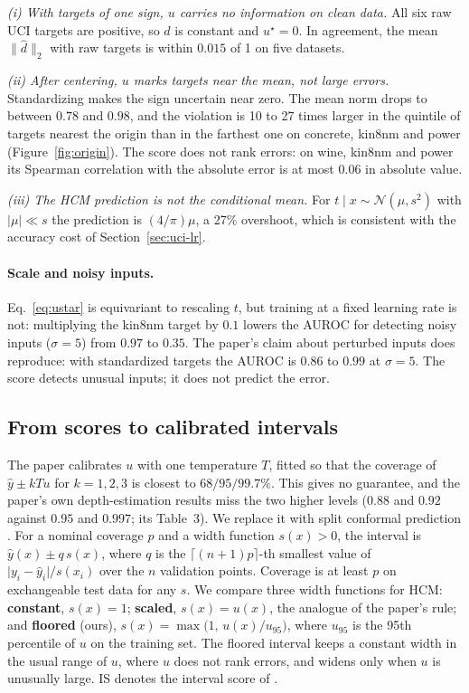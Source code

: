 \emph{(i) With targets of one sign, $u$ carries no information on clean data.} All six raw
UCI targets are positive, so $d$ is constant and $u^\star=0$. In agreement, the mean
$\lVert\hat d\rVert_2$ with raw targets is within $0.015$ of 1 on five datasets.

\emph{(ii) After centering, $u$ marks targets near the mean, not large errors.}
Standardizing makes the sign uncertain near zero. The mean norm drops to between $0.78$ and
$0.98$, and the violation is 10 to 27 times larger in the quintile of targets nearest the
origin than in the farthest one on concrete, kin8nm and power (Figure~\ref{fig:origin}).
The score does not rank errors: on wine, kin8nm and power its Spearman correlation with the
absolute error is at most $0.06$ in absolute value.

\emph{(iii) The HCM prediction is not the conditional mean.} For
$t\mid x\sim\mathcal{N}(\mu,s^2)$ with $\lvert\mu\rvert\ll s$ the prediction is $(4/\pi)\mu$,
a 27\% overshoot, which is consistent with the accuracy cost of
Section~\ref{sec:uci-lr}.

\paragraph{Scale and noisy inputs.} Eq.~\eqref{eq:ustar} is equivariant to rescaling $t$,
but training at a fixed learning rate is not: multiplying the kin8nm target by $0.1$ lowers
the AUROC for detecting noisy inputs ($\sigma=5$) from $0.97$ to $0.35$. The paper's claim
about perturbed inputs does reproduce: with standardized targets the AUROC is $0.86$ to
$0.99$ at $\sigma=5$. The score detects unusual inputs; it does not predict the error.

\subsection{From scores to calibrated intervals}
\label{sec:uci-intervals}

The paper calibrates $u$ with one temperature $T$, fitted so that the coverage of
$\hat y\pm kTu$ for $k=1,2,3$ is closest to $68/95/99.7\%$. This gives no guarantee, and
the paper's own depth-estimation results miss the two higher levels ($0.88$ and $0.92$
against $0.95$ and $0.997$; its Table~3). We replace it with split conformal prediction
\citep{vovk2005algorithmic,angelopoulos2021gentle}. For a nominal coverage $p$ and a width
function $s(x)>0$, the interval is $\hat y(x)\pm q\,s(x)$, where $q$ is the
$\lceil (n+1)p\rceil$-th smallest value of $\lvert y_i-\hat y_i\rvert/s(x_i)$ over the $n$
validation points. Coverage is at least $p$ on exchangeable test data for any $s$. We
compare three width functions for HCM: \textbf{constant}, $s(x)=1$; \textbf{scaled},
$s(x)=u(x)$, the analogue of the paper's rule; and \textbf{floored} (ours),
$s(x)=\max\bigl(1,\,u(x)/u_{95}\bigr)$, where $u_{95}$ is the 95th percentile of $u$ on the
training set. The floored interval keeps a constant width in the usual range of $u$, where
$u$ does not rank errors, and widens only when $u$ is unusually large. IS denotes the
interval score of \citet{gneiting2007strictly}.

